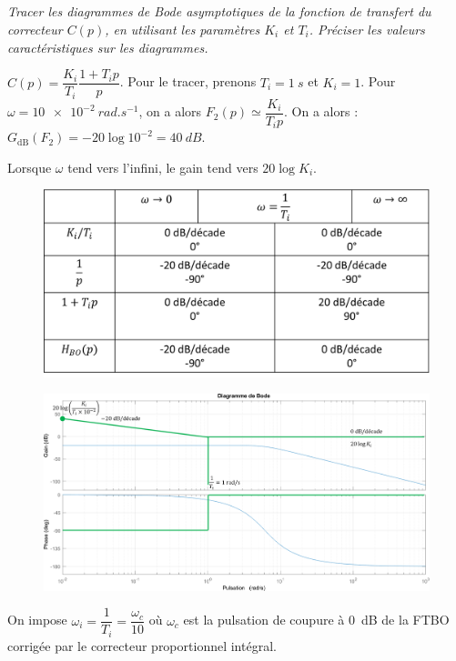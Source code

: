 \documentclass[10pt,fleqn]{article} %
\begin{document}
\subparagraph{\label{q_29_bis}}\textit{Tracer les diagrammes de Bode asymptotiques de la fonction de transfert du correcteur $C(p)$, en utilisant les paramètres $K_i$ et $T_i$. Préciser les valeurs caractéristiques sur les diagrammes.}
\ifprof
\begin{corrige}
 $C(p)=\dfrac{K_i}{T_i} \dfrac{1+T_i p}{ p} $.  
 Pour le tracer, prenons $T_i=\SI{1}{s}$ et $K_i = 1$. Pour $\omega=\SI{10e-2}{rad.s^{-1}}$, on a alors  $F_2(p) \simeq \dfrac{K_i}{T_i p}$. On a alors : 
 $G_{\text{dB}}(F_2) = -20 \log 10^{-2} = \SI{40}{dB} $.
 

 Lorsque $\omega$ tend vers l'infini, le gain tend vers $20\log K_i$.


\begin{figure}[H]
\centering
\includegraphics[width=0.7\linewidth]{cor_11}
\end{figure}


\begin{figure}[H]
\centering
\includegraphics[width=0.7\linewidth]{cor_12}
\end{figure}
 
\end{corrige}
\else
\fi

On impose $\omega_i = \dfrac{1}{T_i}=\dfrac{\omega_c}{10}$ où $\omega_c$ est la pulsation de coupure à \SI{0}{dB} de la FTBO corrigée par le correcteur proportionnel intégral.
\end{document}
